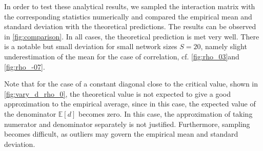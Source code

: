 \documentclass[10pt]{article}
\begin{document}
In order to test these analytical results, we sampled the interaction matrix with
the corresponding statistics numerically and compared the empirical mean 
and standard deviation with the theoretical predictions. 
The results can be observed in \autoref{fig:comparison}. 
In all cases, the theoretical prediction is met very well. 
There is a notable but small deviation for small network sizes  $S = 20$, 
namely slight underestimation of the mean for the case of correlation, 
cf. \autoref{fig:rho_03}and \autoref{fig:rho_-07}. 

Note that for the case of a constant diagonal close to the critical value,
shown in \autoref{fig:vary_d_rho_0}, 
the theoretical value is not expected to give a good 
approximation to the empirical average, since in this case, 
the expected value of the denominator $\mathbb{E}[d]$ becomes 
zero. In this case, the approximation of taking numerator 
and denominator separately is not justified. Furthermore, 
sampling becomes difficult, as outliers may govern the empirical 
mean and standard deviation. 
\end{document}
